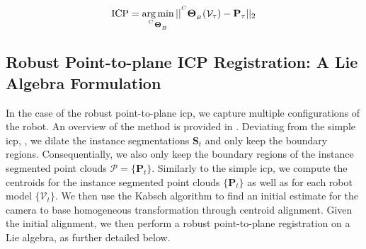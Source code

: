 \begin{equation}
    \label{c1:eq:icp}
    \text{ICP} = \argmin_{\homogeneous{C}{B}} || \homogeneous{C}{B}(\mathcal{V}_\tau) - \mathbf{P}_\tau||_2
\end{equation}

\subsection{Robust Point-to-plane ICP Registration: A Lie Algebra Formulation}
\label{c1:sec:robust_icp}

In the case of the robust point-to-plane \gls{icp}, we capture multiple configurations of the robot. An overview of the method is provided in . Deviating from the simple \gls{icp}, , we dilate the instance segmentations $\mathbf{S}_t$ and only keep the boundary regions. Consequentially, we also only keep the boundary regions of the instance segmented point clouds $\mathcal{P} = \{\mathbf{P}_t\}$. Similarly to the simple \gls{icp}, we compute the centroids for the instance segmented point clouds $\{\mathbf{P}_t\}$ as well as for each robot model $\{\mathcal{V}_t\}$. We then use the Kabsch algorithm to find an initial estimate for the camera to base homogeneous transformation through centroid alignment. Given the initial alignment, we then perform a robust point-to-plane registration on a Lie algebra, as further detailed below.



